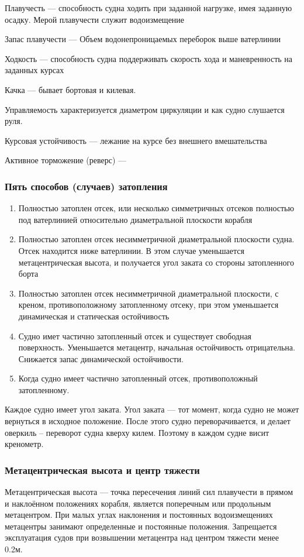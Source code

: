 \documentclass{article}        %
\begin{document}
\begin{description}
Плавучесть --- способность судна ходить при заданной нагрузке, имея заданную осадку.
Мерой плавучести служит водоизмещение

Запас плавучести --- Объем водонепроницаемых переборок выше ватерлинии

Ходкость --- способность судна поддерживать скорость хода и маневренность на заданных курсах

Качка --- бывает бортовая и килевая.

Управляемость характеризуется диаметром циркуляции и как судно слушается руля.

Курсовая устойчивость --- лежание на курсе без внешнего вмешательства

Активное торможение (реверс) --- 

\subsubsection{Пять способов (случаев) затопления}
\begin{enumerate}
	\item Полностью затоплен отсек, или несколько симметричных отсеков полностью под ватерлинией относительно диаметральной плоскости корабля
	\item Полностью затоплен отсек несимметричной диаметральной плоскости судна. Отсек находится ниже ватерлинии. В этом случае уменьшается метацентрическая высота, и получается угол заката со стороны затопленного борта
	\item Полностью затоплен отсек несимметричной диаметральной плоскости, с креном, противоположному затопленному отсеку, при этом уменьшается динамическая и статическая остойчивость
	\item Судно имет частично затопленный отсек и существует свободная поверхность. Уменьшается метацентр, начальная остойчивость отрицательна. Снижается запас динамической остойчивости.
	\item Когда судно имеет частично затопленный отсек, противоположный затопленному.
\end{enumerate}

Каждое судно имеет угол заката. 
Угол заката --- тот момент, когда судно не может вернуться в исходное положение. После этого судно переворачивается, и делает оверкиль -- переворот судна кверху килем.
Поэтому в каждом судне висит кренометр.

\subsubsection{Метацентрическая высота и центр тяжести}
Метацентрическая высота --- точка пересечения линий сил плавучести в прямом и наклоённом положениях корабля, 
	является поперечным или продольным метацентром. При малых углах наклонения и постоянных водоизмещениях метацентры занимают определенные и постоянные положения. Запрещается эксплуатация судов при возвышении метацентра над центром тяжести менее 0.2м. 


\end{description}
\end{document}
